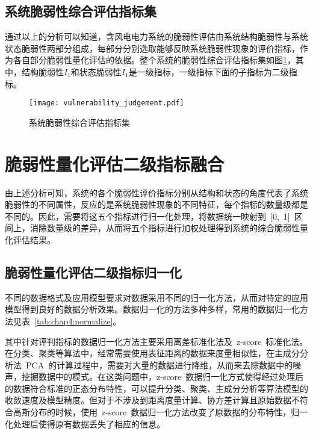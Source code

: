 \subsection{系统脆弱性综合评估指标集}
\label{sec:IndexSys}
通过以上的分析可以知道，含风电电力系统的脆弱性评估由系统结构脆弱性与系统状态脆弱性两部分组成，每部分分别选取能够反映系统脆弱性现象的评价指标，作为各自部分脆弱性量化评估的依据。整个系统的脆弱性综合评估指标集如图\ref{fig:vulnerability_judgement}，其中，结构脆弱性$I_1$和状态脆弱性$I_1$是一级指标，一级指标下面的子指标为二级指标。
\begin{figure}[H] %
  \centering
  \texttt{[image: vulnerability\_judgement.pdf]}
  \caption{系统脆弱性综合评估指标集}
  \label{fig:vulnerability_judgement}
\end{figure}

\section{脆弱性量化评估二级指标融合}
\label{sec:processIndex}
由上述分析可知，系统的各个脆弱性评价指标分别从结构和状态的角度代表了系统脆弱性的不同属性，反应的是系统脆弱性现象的不同特征，每个指标的数量级都是不同的。因此，需要将这五个指标进行归一化处理，将数据统一映射到~[0,~1]~区间上，消除数量级的差异，从而将五个指标进行加权处理得到系统的综合脆弱性量化评估结果。

\subsection{脆弱性量化评估二级指标归一化}
\label{sec:nomalzMethod}
不同的数据格式及应用模型要求对数据采用不同的归一化方法，从而对特定的应用模型得到良好的数据分析效果。数据归一化的方法多种多样，常用的数据归一化方法见表~\ref{tab:chap4:normalize}。

其中针对评判指标的数据归一化方法主要采用离差标准化法及~z-score~标准化法。在分类、聚类等算法中，经常需要使用表征距离的数据来度量相似性，在主成分分析法~PCA~的计算过程中，需要对大量的数据进行降维，从而来去除数据中的噪声，挖掘数据中的模式。在这类问题中，z-score~数据归一化方式使得经过处理后的数据符合标准的正态分布特性，可以提升分类、聚类、主成分分析等算法模型的收敛速度及模型精度。但对于不涉及到距离度量计算、协方差计算且原始数据不符合高斯分布的时候，使用~z-score~数据归一化方法改变了原数据的分布特性，归一化处理后使得原有数据丢失了相应的信息。

